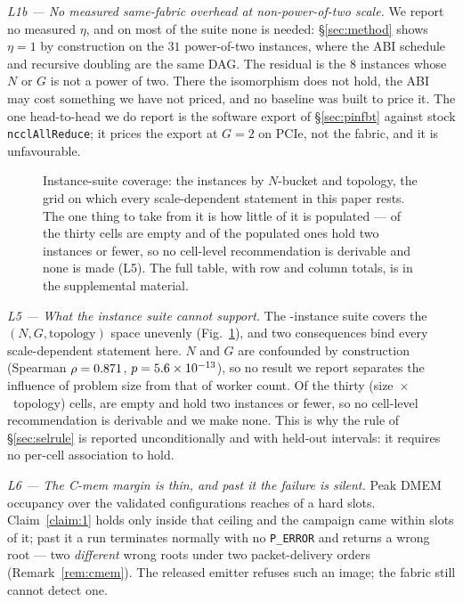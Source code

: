 \documentclass[journal,10pt]{IEEEtran}
\theoremstyle{plain}
\theoremstyle{definition}
\theoremstyle{remark}
\begin{document}
\emph{L1b --- No measured same-fabric overhead at non-power-of-two scale.}
We report no measured $\eta$, and on most of the suite none is needed:
\S\ref{sec:method} shows $\eta = 1$ by construction on the $31$ power-of-two
instances, where the ABI schedule and recursive doubling are the same DAG.
The residual is the $8$ instances whose $N$ or $G$ is not a power of two. There
the isomorphism does not hold, the ABI may cost something we have not priced,
and no baseline was built to price it. The one head-to-head we do report is the
software export of
\S\ref{sec:pinfbt} against stock \texttt{ncclAllReduce}; it prices the
export at $G{=}2$ on PCIe, not the fabric, and it is unfavourable.

\begin{figure}[!tb]
\centering

\caption{Instance-suite coverage: the \SuiteSize{} instances by $N$-bucket and
  topology, the grid on which every scale-dependent statement in this paper
  rests. The one thing to take from it is how little of it is populated ---
  \SuiteEmptyCells{} of the thirty cells are empty and \SuiteThinCells{} of
  the populated ones hold two instances or fewer, so no cell-level
  recommendation is derivable and none is made (L5). The full table, with row
  and column totals, is in the supplemental material.}
\label{fig:coverage}
\end{figure}

\emph{L5 --- What the instance suite cannot support.} The \SuiteSize{}-instance
suite covers the $(N, G, \text{topology})$ space unevenly
(Fig.~\ref{fig:coverage}), and two consequences bind every scale-dependent
statement here. $N$ and $G$ are confounded by construction (Spearman
$\rho = 0.871$, $p = 5.6\times10^{-13}$), so no result we report separates the
influence of problem size from that of worker count. Of the thirty
(size~$\times$~topology) cells, \SuiteEmptyCells{} are
empty and \SuiteThinCells{} hold two instances or fewer, so no cell-level
recommendation is derivable and we make none. This is
why the rule of \S\ref{sec:selrule} is reported unconditionally and with
held-out intervals: it requires no per-cell association to hold.

\emph{L6 --- The \textsf{C-mem} margin is thin, and past it the failure is
silent.} Peak DMEM occupancy over the validated configurations reaches
\DmemPeakMax{} of a hard \DmemDepth{} slots. Claim~\ref{claim:1} holds only
inside that ceiling and the campaign came within \DmemMargin{} slots of it;
past it a run terminates normally with no \texttt{P\_ERROR} and returns a wrong
root --- two \emph{different} wrong roots under two packet-delivery orders
(Remark~\ref{rem:cmem}). The released emitter refuses such an image; the fabric
still cannot detect one.
\end{document}

